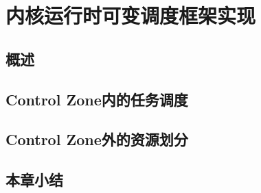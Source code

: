 \chapter{内核运行时可变调度框架实现}\label{chap:control_zone}

\section{概述}


\section{Control Zone内的任务调度}

\section{Control Zone外的资源划分}

\section{本章小结}